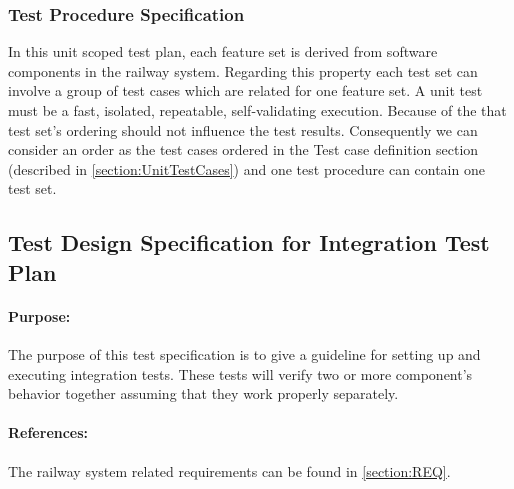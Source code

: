 \noindent\subsubsection{Test Procedure Specification}
In this unit scoped test plan, each feature set is derived from software components in the railway system. Regarding this property each test set can involve a group of test cases which are related for one feature set. A unit test must be a fast, isolated, repeatable, self-validating execution. Because of the that test set's ordering should not influence the test results. Consequently we can consider an order as the test cases ordered in the Test case definition section (described in \autoref{section:UnitTestCases}) and one test procedure can contain one test set. 

\subsection{Test Design Specification for Integration Test Plan}

\paragraph{Purpose:} The purpose of this test specification is to give a guideline for setting up and executing integration tests. These tests will verify two or more component's behavior together assuming that they work properly separately.
\paragraph{References:} The railway system related requirements can be found in \autoref{section:REQ}.

